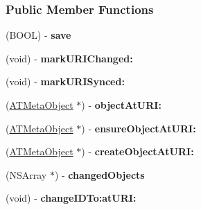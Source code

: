 \subsubsection*{Public Member Functions}
\begin{DoxyCompactItemize}
\item 
\hypertarget{interface_a_t_meta_context_adfa6a19a0196a1e47d82781f888c6136}{
(BOOL) -\/ {\bfseries save}}
\label{interface_a_t_meta_context_adfa6a19a0196a1e47d82781f888c6136}

\item 
\hypertarget{interface_a_t_meta_context_a374a353d6271cd493f9c5cf33630eb6b}{
(void) -\/ {\bfseries markURIChanged:}}
\label{interface_a_t_meta_context_a374a353d6271cd493f9c5cf33630eb6b}

\item 
\hypertarget{interface_a_t_meta_context_a6bcf5e7ee7c5b9a7c0fbccdf7723623c}{
(void) -\/ {\bfseries markURISynced:}}
\label{interface_a_t_meta_context_a6bcf5e7ee7c5b9a7c0fbccdf7723623c}

\item 
\hypertarget{interface_a_t_meta_context_a206094bc4db6c78668fb4593f0d59fec}{
(\hyperlink{interface_a_t_meta_object}{ATMetaObject} $\ast$) -\/ {\bfseries objectAtURI:}}
\label{interface_a_t_meta_context_a206094bc4db6c78668fb4593f0d59fec}

\item 
\hypertarget{interface_a_t_meta_context_a7b970df053c1bc1869ccb99945f383fb}{
(\hyperlink{interface_a_t_meta_object}{ATMetaObject} $\ast$) -\/ {\bfseries ensureObjectAtURI:}}
\label{interface_a_t_meta_context_a7b970df053c1bc1869ccb99945f383fb}

\item 
\hypertarget{interface_a_t_meta_context_af23b62b46612b08980a321f0b23cedd4}{
(\hyperlink{interface_a_t_meta_object}{ATMetaObject} $\ast$) -\/ {\bfseries createObjectAtURI:}}
\label{interface_a_t_meta_context_af23b62b46612b08980a321f0b23cedd4}

\item 
\hypertarget{interface_a_t_meta_context_a0cd0fe9a4ed8999db95f9bd843fb6536}{
(NSArray $\ast$) -\/ {\bfseries changedObjects}}
\label{interface_a_t_meta_context_a0cd0fe9a4ed8999db95f9bd843fb6536}

\item 
\hypertarget{interface_a_t_meta_context_a154ebbae634a69798821aa99f63e36f6}{
(void) -\/ {\bfseries changeIDTo:atURI:}}
\label{interface_a_t_meta_context_a154ebbae634a69798821aa99f63e36f6}

\end{DoxyCompactItemize}
